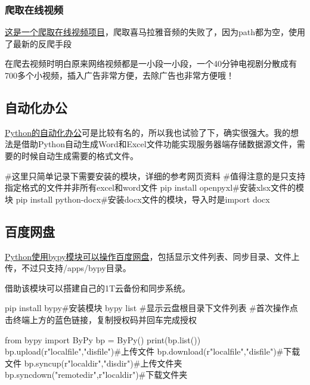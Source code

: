 \subsubsection{爬取在线视频}
\href{https://blog.csdn.net/u011223449/article/details/136110053}{这是一个爬取在线视频项目}，爬取喜马拉雅音频的失败了，因为path都为空，使用了最新的反爬手段

在爬去视频时明白原来网络视频都是一小段一小段，一个40分钟电视剧分散成有700多个小视频，插入广告非常方便，去除广告也非常方便哦！
\subsection{自动化办公}
\href{https://blog.csdn.net/weixin_41261833/article/details/106028038?spm=1001.2014.3001.5506}{Python的自动化办公}可是比较有名的，所以我也试验了下，确实很强大。我的想法是借助Python自动生成Word和Excel文件功能实现服务器端存储数据源文件，需要的时候自动生成需要的格式文件。
\begin{shell}
#这里只简单记录下需要安装的模块，详细的参考网页资料
#值得注意的是只支持指定格式的文件并非所有excel和word文件
pip install openpyxl#安装xlsx文件的模块
pip install python-docx#安装docx文件的模块，导入时是import docx
\end{shell}

\subsection{百度网盘}
\href{https://blog.csdn.net/u010751000/article/details/130191192?ops_request_misc=%257B%2522request%255Fid%2522%253A%25221986353ffb0d0d65f2126a7f2b677eda%2522%252C%2522scm%2522%253A%252220140713.130102334..%2522%257D&request_id=1986353ffb0d0d65f2126a7f2b677eda&biz_id=0&utm_medium=distribute.pc_search_result.none-task-blog-2~all~sobaiduend~default-2-130191192-null-null.142^v101^pc_search_result_base7&utm_term=python%E7%99%BE%E5%BA%A6%E7%BD%91%E7%9B%98&spm=1018.2226.3001.4187}{Python使用bypy模块可以操作百度网盘}，包括显示文件列表、同步目录、文件上传，不过只支持/apps/bypy目录。

借助该模块可以搭建自己的1T云备份和同步系统。
\begin{shell}
pip install bypy#安装模块
bypy list #显示云盘根目录下文件列表
#首次操作点击终端上方的蓝色链接，复制授权码并回车完成授权
\end{shell}
\begin{shell}
from bypy import ByPy
bp = ByPy()
print(bp.list())
bp.upload(r"localfile","disfile")#上传文件
bp.download(r"localfile","disfile")#下载文件
bp.syncup(r"localdir","disdir")#上传文件夹
bp.syncdown("remotedir",r"localdir")#下载文件夹
\end{shell}
